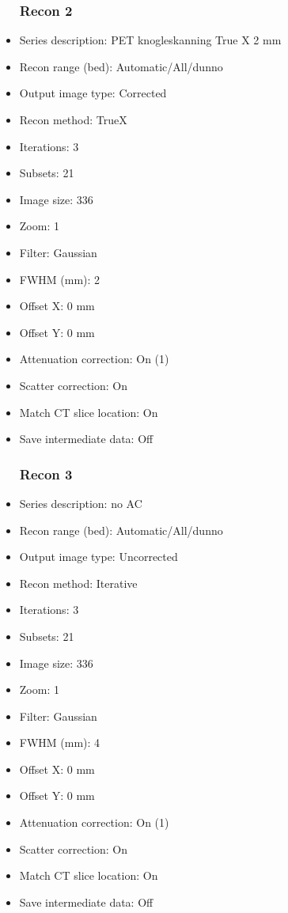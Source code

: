 \documentclass[12pt]{article}
\begin{document}
\begin{itemize}
\subsubsection{Recon 2}
\item Series description: PET knogleskanning  True X 2 mm
\item Recon range (bed): Automatic/All/dunno
\item Output image type: Corrected
\item Recon method: TrueX
\item Iterations: 3
\item Subsets: 21
\item Image size: 336
\item Zoom: 1
\item Filter: Gaussian
\item FWHM (mm): 2
\item Offset X: 0 mm
\item Offset Y: 0 mm
\item Attenuation correction: On (1)
\item Scatter correction: On
\item Match CT slice location: On
\item Save intermediate data: Off
\subsubsection{Recon 3}
\item Series description: no AC
\item Recon range (bed): Automatic/All/dunno
\item Output image type: Uncorrected
\item Recon method: Iterative
\item Iterations: 3
\item Subsets: 21
\item Image size: 336
\item Zoom: 1
\item Filter: Gaussian
\item FWHM (mm): 4
\item Offset X: 0 mm
\item Offset Y: 0 mm
\item Attenuation correction: On (1)
\item Scatter correction: On
\item Match CT slice location: On
\item Save intermediate data: Off

\end{itemize}
\end{document}
